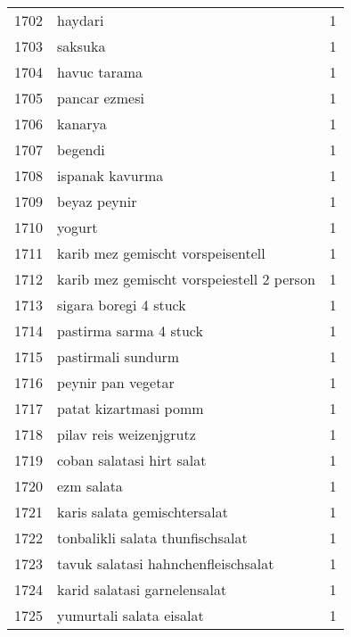 \begin{tabular}{llr}
1702 &                                            haydari &      1 \\
1703 &                                            saksuka &      1 \\
1704 &                                       havuc tarama &      1 \\
1705 &                                      pancar ezmesi &      1 \\
1706 &                                            kanarya &      1 \\
1707 &                                            begendi &      1 \\
1708 &                                    ispanak kavurma &      1 \\
1709 &                                       beyaz peynir &      1 \\
1710 &                                             yogurt &      1 \\
1711 &                  karib mez gemischt vorspeisentell &      1 \\
1712 &          karib mez gemischt vorspeiestell 2 person &      1 \\
1713 &                              sigara boregi 4 stuck &      1 \\
1714 &                             pastirma sarma 4 stuck &      1 \\
1715 &                                 pastirmali sundurm &      1 \\
1716 &                                 peynir pan vegetar &      1 \\
1717 &                              patat kizartmasi pomm &      1 \\
1718 &                            pilav reis weizenjgrutz &      1 \\
1719 &                          coban salatasi hirt salat &      1 \\
1720 &                                         ezm salata &      1 \\
1721 &                       karis salata gemischtersalat &      1 \\
1722 &                   tonbalikli salata thunfischsalat &      1 \\
1723 &                tavuk salatasi hahnchenfleischsalat &      1 \\
1724 &                       karid salatasi garnelensalat &      1 \\
1725 &                           yumurtali salata eisalat &      1 \\

\end{tabular}
